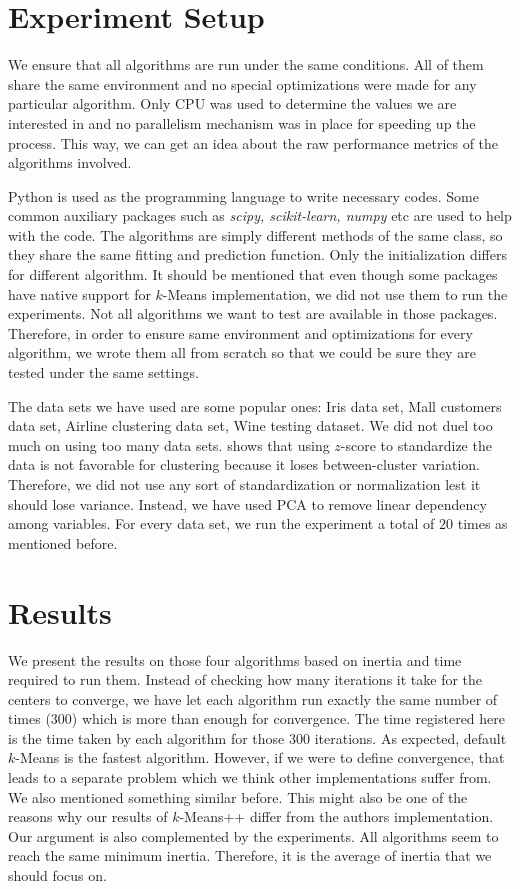 \documentclass[twoside, 11pt]{article}
\begin{document}
	\section{Experiment Setup}
	We ensure that all algorithms are run under the same conditions. All of them share the same environment and no special optimizations were made for any particular algorithm. Only CPU was used to determine the values we are interested in and no parallelism mechanism was in place for speeding up the process. This way, we can get an idea about the raw performance metrics of the algorithms involved.
	
	Python is used as the programming language to write necessary codes. Some common auxiliary packages such as \textit{scipy, scikit-learn, numpy} etc are used to help with the code. The algorithms are simply different methods of the same class, so they share the same fitting and prediction function. Only the initialization differs for different algorithm. It should be mentioned that even though some packages have native support for $k$-Means implementation, we did not use them to run the experiments. Not all algorithms we want to test are available in those packages. Therefore, in order to ensure same environment and optimizations for every algorithm, we wrote them all from scratch so that we could be sure they are tested under the same settings.
	
	The data sets we have used are some popular ones: Iris data set, Mall customers data set, Airline clustering data set, Wine testing dataset. We did not duel too much on using too many data sets. \cite{miligan} shows that using $z$-score to standardize the data is not favorable for clustering because it loses between-cluster variation. Therefore, we did not use any sort of standardization or normalization lest it should lose variance. Instead, we have used PCA to remove linear dependency among variables. For every data set, we run the experiment a total of $20$ times as mentioned before.
	\section{Results}
	We present the results on those four algorithms based on inertia and time required to run them. Instead of checking how many iterations it take for the centers to converge, we have let each algorithm run exactly the same number of times ($300$) which is more than enough for convergence. The time registered here is the time taken by each algorithm for those $300$ iterations. As expected, default $k$-Means is the fastest algorithm. However, if we were to define convergence, that leads to a separate problem which we think other implementations suffer from. We also mentioned something similar before. This might also be one of the reasons why our results of $k$-Means++ differ from the authors implementation. Our argument is also complemented by the experiments. All algorithms seem to reach the same minimum inertia. Therefore, it is the average of inertia that we should focus on.
\end{document}
